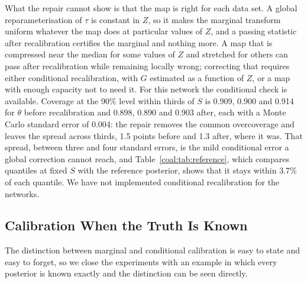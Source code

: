 What the repair cannot show is that the map is right for each data set. A global reparameterisation of $\tau$ is constant in $Z$, so it makes the marginal transform uniform whatever the map does at particular values of $Z$, and a passing statistic after recalibration certifies the marginal and nothing more. A map that is compressed near the median for some values of $Z$ and stretched for others can pass after recalibration while remaining locally wrong; correcting that requires either conditional recalibration, with $G$ estimated as a function of $Z$, or a map with enough capacity not to need it. For this network the conditional check is available. Coverage at the 90\% level within thirds of $S$ is 0.909, 0.900 and 0.914 for $\theta$ before recalibration and 0.898, 0.890 and 0.903 after, each with a Monte Carlo standard error of 0.004: the repair removes the common overcoverage and leaves the spread across thirds, 1.5 points before and 1.3 after, where it was. That spread, between three and four standard errors, is the mild conditional error a global correction cannot reach, and Table~\ref{coal:tab:reference}, which compares quantiles at fixed $S$ with the reference posterior, shows that it stays within 3.7\% of each quantile. We have not implemented conditional recalibration for the networks.

\subsection{Calibration When the Truth Is Known}\label{coal:sec:sbcex}

The distinction between marginal and conditional calibration is easy to state and easy to forget, so we close the experiments with an example in which every posterior is known exactly and the distinction can be seen directly.

